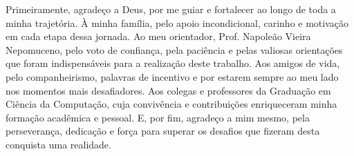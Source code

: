 Primeiramente, agradeço a Deus, por me guiar e fortalecer ao longo de toda a minha trajetória.
\BlankLine
À minha família, pelo apoio incondicional, carinho e motivação em cada etapa dessa jornada.
\BlankLine
Ao meu orientador, Prof. Napoleão Vieira Nepomuceno, pelo voto de confiança, pela paciência e pelas valiosas orientações que foram indispensáveis para a realização deste trabalho.
\BlankLine
Aos amigos de vida, pelo companheirismo, palavras de incentivo e por estarem sempre ao meu lado nos momentos mais desafiadores.
\BlankLine
Aos colegas e professores da Graduação em Ciência da Computação, cuja convivência e contribuições enriqueceram minha formação acadêmica e pessoal.
\BlankLine
E, por fim, agradeço a mim mesmo, pela perseverança, dedicação e força para superar os desafios que fizeram desta conquista uma realidade.